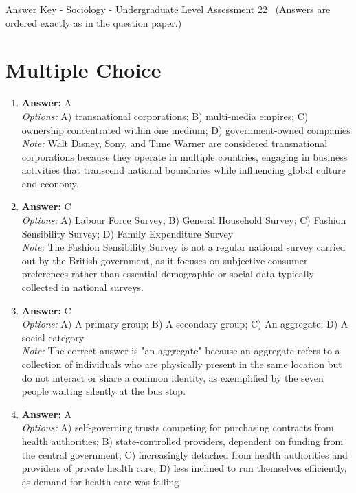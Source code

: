 \documentclass[12pt]{article}
\begin{document}
\begin{center}
Answer Key - Sociology - Undergraduate Level Assessment 22 \
\small (Answers are ordered exactly as in the question paper.)
\end{center}

\section*{Multiple Choice}
\begin{enumerate}[label=\arabic*.]
\item \textbf{Answer:} A
\\ \textit{Options:} A) transnational corporations; B) multi-media empires; C) ownership concentrated within one medium; D) government-owned companies
\\ \textit{Note:} Walt Disney, Sony, and Time Warner are considered transnational corporations because they operate in multiple countries, engaging in business activities that transcend national boundaries while influencing global culture and economy.
\item \textbf{Answer:} C
\\ \textit{Options:} A) Labour Force Survey; B) General Household Survey; C) Fashion Sensibility Survey; D) Family Expenditure Survey
\\ \textit{Note:} The Fashion Sensibility Survey is not a regular national survey carried out by the British government, as it focuses on subjective consumer preferences rather than essential demographic or social data typically collected in national surveys.
\item \textbf{Answer:} C
\\ \textit{Options:} A) A primary group; B) A secondary group; C) An aggregate; D) A social category
\\ \textit{Note:} The correct answer is "an aggregate" because an aggregate refers to a collection of individuals who are physically present in the same location but do not interact or share a common identity, as exemplified by the seven people waiting silently at the bus stop.
\item \textbf{Answer:} A
\\ \textit{Options:} A) self-governing trusts competing for purchasing contracts from health authorities; B) state-controlled providers, dependent on funding from the central government; C) increasingly detached from health authorities and providers of private health care; D) less inclined to run themselves efficiently, as demand for health care was falling

\end{enumerate}
\end{document}

